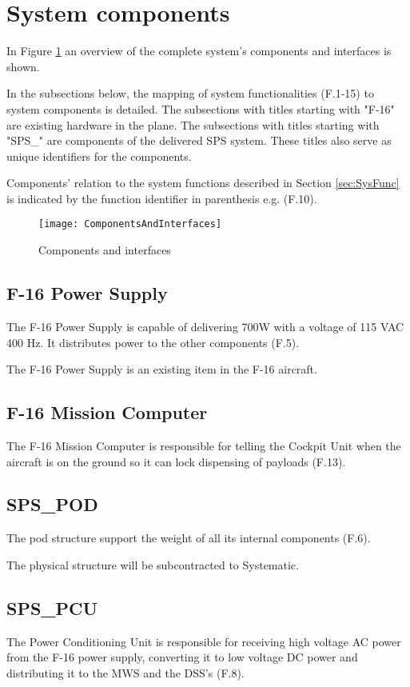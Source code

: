 \documentclass[Main]{subfiles}
\begin{document}
\section{System components}

In Figure \ref{fig:ComponentsAndInterfaces} an overview of the complete system's components and interfaces is shown.

In the subsections below, the mapping of system functionalities (F.1-15) to system components is detailed.
The subsections with titles starting with "F-16" are existing hardware in the plane.
The subsections with titles starting with "SPS\_" are components of the delivered SPS system.
These titles also serve as unique identifiers for the components.

Components' relation to the system functions described in Section \ref{sec:SysFunc} is indicated by the function identifier in parenthesis e.g. (F.10).

\begin{figure}[H]
\centering
\texttt{[image: ComponentsAndInterfaces]}
\caption{Components and interfaces}
\label{fig:ComponentsAndInterfaces}
\end{figure}

\subsection{F-16 Power Supply}
The F-16 Power Supply is capable of delivering 700W with a voltage of 115 VAC 400 Hz. It distributes power to the other components (F.5).

The F-16 Power Supply is an existing item in the F-16 aircraft.

\subsection{F-16 Mission Computer}
The F-16 Mission Computer is responsible for telling the Cockpit Unit when the aircraft is on the ground so it can lock dispensing of payloads (F.13).

\subsection{SPS\_POD}
The pod structure support the weight of all its internal components (F.6).

The physical structure will be subcontracted to Systematic.

\subsection{SPS\_PCU}
The Power Conditioning Unit is responsible for receiving high voltage AC power from the F-16 power supply, converting it to low voltage DC power and distributing it to the MWS and the DSS's (F.8).
\end{document}
